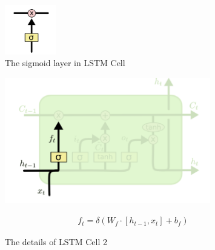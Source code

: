 \documentclass[12pt,a4paper]{article}
\begin{document}
\begin{figure}
\centering   
\includegraphics[width=0.2\textwidth]{pic/5.PNG}
\caption{The sigmoid layer in LSTM Cell}
 \label{fig:5} 
\end{figure}


\begin{figure}
\begin{minipage}[c]{0.5\textwidth}
\centering   
\includegraphics[width=0.8\textwidth]{pic/6.PNG}
\end{minipage}
%
\begin{minipage}[c]{0.5\textwidth}
\begin{equation*}
	\begin{array}{l}
	f_t = \delta(W_f \cdot [h_{t-1}, x_t] + b_f)
	\end{array}
\end{equation*}
\end{minipage}
\caption{The details of LSTM Cell 2}
 \label{fig:6} 
\end{figure}
\end{document}
